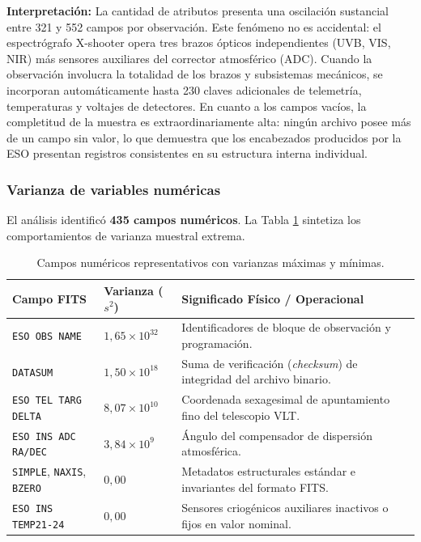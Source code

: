 \documentclass[10pt]{article}
\begin{document}
\textbf{Interpretación:} La cantidad de atributos presenta una oscilación sustancial entre 321 y 552 campos por observación. Este fenómeno no es accidental: el espectrógrafo X-shooter opera tres brazos ópticos independientes (UVB, VIS, NIR) más sensores auxiliares del corrector atmosférico (ADC). Cuando la observación involucra la totalidad de los brazos y subsistemas mecánicos, se incorporan automáticamente hasta 230 claves adicionales de telemetría, temperaturas y voltajes de detectores. En cuanto a los campos vacíos, la completitud de la muestra es extraordinariamente alta: ningún archivo posee más de un campo sin valor, lo que demuestra que los encabezados producidos por la ESO presentan registros consistentes en su estructura interna individual.

\subsubsection{Varianza de variables numéricas}
El análisis identificó \textbf{435 campos numéricos}. La Tabla \ref{tab:varianza_top} sintetiza los comportamientos de varianza muestral extrema.

\begin{table}[ht]
\centering
\small
\caption{Campos numéricos representativos con varianzas máximas y mínimas.}
\label{tab:varianza_top}
\begin{tabularx}{\textwidth}{lp{3.5cm}X}
\toprule
\textbf{Campo FITS} & \textbf{Varianza ($s^2$)} & \textbf{Significado Físico / Operacional} \\
\midrule
\texttt{ESO OBS NAME} & $1,65 \times 10^{32}$ & Identificadores de bloque de observación y programación. \\
\texttt{DATASUM} & $1,50 \times 10^{18}$ & Suma de verificación (\textit{checksum}) de integridad del archivo binario. \\
\texttt{ESO TEL TARG DELTA} & $8,07 \times 10^{10}$ & Coordenada sexagesimal de apuntamiento fino del telescopio VLT. \\
\texttt{ESO INS ADC RA/DEC} & $3,84 \times 10^{9}$ & Ángulo del compensador de dispersión atmosférica. \\
\midrule
\texttt{SIMPLE}, \texttt{NAXIS}, \texttt{BZERO} & $0,00$ & Metadatos estructurales estándar e invariantes del formato FITS. \\
\texttt{ESO INS TEMP21-24} & $0,00$ & Sensores criogénicos auxiliares inactivos o fijos en valor nominal. \\
\bottomrule
\end{tabularx}
\end{table}
\end{document}
